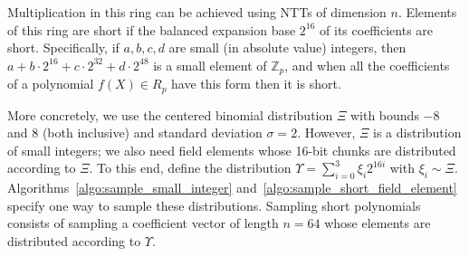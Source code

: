 Multiplication in this ring can be achieved using NTTs of dimension $n$. Elements of this ring are short if the balanced expansion base $2^{16}$ of its coefficients are short. Specifically, if $a, b, c, d$ are small  (in absolute value) integers, then $a + b \cdot 2^{16} + c \cdot 2^{32} + d \cdot 2^{48}$ is a small element of $\mathbb{Z}_p$, and when all the coefficients of a polynomial $f(X) \in R_p$ have this form then it is short.

More concretely, we use the centered binomial distribution $\Xi$ with bounds $-8$ and $8$ (both inclusive) and standard deviation $\sigma = 2$. However, $\Xi$ is a distribution of small integers; we also need field elements whose 16-bit chunks are distributed according to $\Xi$. To this end, define the distribution $\Upsilon = \sum_{i=0}^{3} \xi_i 2^{16i}$ with $\xi_i \sim \Xi$. Algorithms~\ref{algo:sample_small_integer} and~\ref{algo:sample_short_field_element} specify one way to sample these distributions. Sampling short polynomials consists of sampling a coefficient vector of length $n = 64$ whose elements are distributed according to $\Upsilon$.


\begin{algorithm}[!t] \label{algo:sample_small_integer}
\begin{scriptsize}
\caption{\emph{$\mathsf{sample\_small\_integer}$}}
\KwIn{}
\end{scriptsize}
\end{algorithm} 

\begin{algorithm}[!t] \label{algo:sample_short_field_element}
\begin{scriptsize}
\caption{\emph{$\mathsf{sample\_short\_field\_element}$}}
\KwIn{}
\end{scriptsize}
\end{algorithm} 

